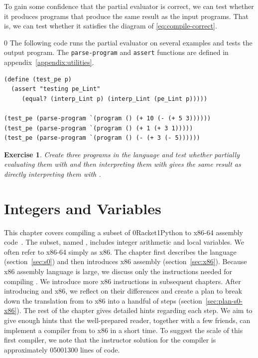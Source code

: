 \documentclass[7x10]{TimesAPriori_MIT}%
\def\racketEd{0}
\def\pythonEd{1}
\def\edition{1}
\newcommand{\racket}[1]{{\if\edition\racketEd{#1}\fi}}
\newcommand{\pythonColor}[0]{}
\newcommand{\python}[1]{{\if\edition\pythonEd\pythonColor #1\fi}}
\newtheorem{exercise}[theorem]{Exercise}
\numberwithin{theorem}{chapter}
\numberwithin{definition}{chapter}
\numberwithin{equation}{chapter}
\begin{document}
To gain some confidence that the partial evaluator is correct, we can
test whether it produces programs that produce the same result as the
input programs. That is, we can test whether it satisfies the diagram
of \eqref{eq:compile-correct}.
%
{\if\edition\racketEd
The following code runs the partial evaluator on several examples and
tests the output program.  The \texttt{parse-program} and
\texttt{assert} functions are defined in
appendix~\ref{appendix:utilities}.\\
\begin{minipage}{1.0\textwidth}
\begin{lstlisting}
(define (test_pe p)
  (assert "testing pe_Lint"
     (equal? (interp_Lint p) (interp_Lint (pe_Lint p)))))

(test_pe (parse-program `(program () (+ 10 (- (+ 5 3))))))
(test_pe (parse-program `(program () (+ 1 (+ 3 1)))))
(test_pe (parse-program `(program () (- (+ 3 (- 5))))))
\end{lstlisting}
\end{minipage}
\fi}

\begin{exercise}\normalfont\normalsize
  Create three programs in the \LangInt{} language and test whether
  partially evaluating them with  and then
  interpreting them with  gives the same result
  as directly interpreting them with .
\end{exercise}


\chapter{Integers and Variables}
\label{ch:Lvar}
\setcounter{footnote}{0}

This chapter covers compiling a subset of
\racket{Racket}\python{Python} to x86-64 assembly
code~\citep{Intel:2015aa}. The subset, named \LangVar{}, includes
integer arithmetic and local variables.  We often refer to x86-64
simply as x86.  The chapter first describes the \LangVar{} language
(section~\ref{sec:s0}) and then introduces x86 assembly
(section~\ref{sec:x86}). Because x86 assembly language is large, we
discuss only the instructions needed for compiling \LangVar{}. We
introduce more x86 instructions in subsequent chapters.  After
introducing \LangVar{} and x86, we reflect on their differences and
create a plan to break down the translation from \LangVar{} to x86
into a handful of steps (section~\ref{sec:plan-s0-x86}).  The rest of
the chapter gives detailed hints regarding each step.  We aim to give
enough hints that the well-prepared reader, together with a few
friends, can implement a compiler from \LangVar{} to x86 in a short
time.  To suggest the scale of this first compiler, we note that the
instructor solution for the \LangVar{} compiler is approximately
\racket{500}\python{300} lines of code.
\end{document}
